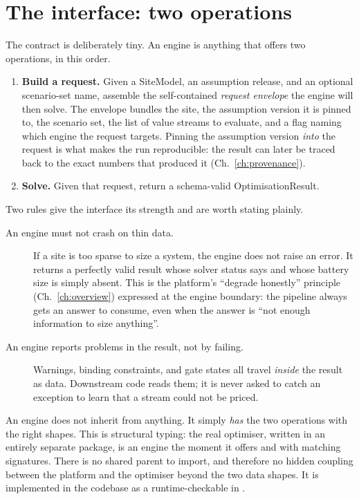 \section{The interface: two operations}

The contract is deliberately tiny. An engine is anything that offers two operations, in this order.

\begin{enumerate}
  \item \textbf{Build a request.} Given a SiteModel, an assumption release, and an optional scenario-set name, assemble the self-contained \emph{request envelope} the engine will then solve. The envelope bundles the site, the assumption version it is pinned to, the scenario set, the list of value streams to evaluate, and a flag naming which engine the request targets. Pinning the assumption version \emph{into} the request is what makes the run reproducible: the result can later be traced back to the exact numbers that produced it (Ch.~\ref{ch:provenance}).
  \item \textbf{Solve.} Given that request, return a schema-valid OptimisationResult.
\end{enumerate}

Two rules give the interface its strength and are worth stating plainly.

\begin{description}
  \item[An engine must not crash on thin data.] If a site is too sparse to size a system, the engine does not raise an error. It returns a perfectly valid result whose solver status says  and whose battery size is simply absent. This is the platform's ``degrade honestly'' principle (Ch.~\ref{ch:overview}) expressed at the engine boundary: the pipeline always gets an answer to consume, even when the answer is ``not enough information to size anything''.
  \item[An engine reports problems in the result, not by failing.] Warnings, binding constraints, and gate states all travel \emph{inside} the result as data. Downstream code reads them; it is never asked to catch an exception to learn that a stream could not be priced.
\end{description}

\begin{caution}
An engine does not inherit from anything. It simply \emph{has} the two operations with the right shapes. This is structural typing: the real optimiser, written in an entirely separate package, is an engine the moment it offers  and  with matching signatures. There is no shared parent to import, and therefore no hidden coupling between the platform and the optimiser beyond the two data shapes. It is implemented in the codebase as a runtime-checkable  in .
\end{caution}

